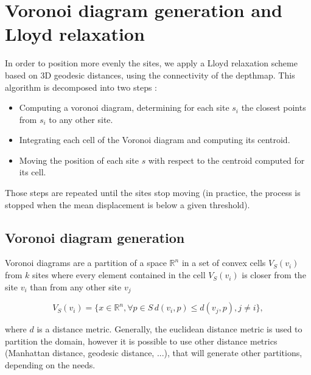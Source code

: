 \documentclass[11pt,fleqn]{book} %
\newcommand{\arnaud}[1]{\textcolor{red}{$<$ #1 $>$}}
\begin{document}

\section{Voronoi diagram generation and Lloyd relaxation}
\label{sec:lloyd_relaxation}

In order to position more evenly the sites, we apply a Lloyd relaxation scheme based on 3D geodesic distances, using the connectivity of the depthmap.
This algorithm is decomposed into two steps : 

\begin{itemize}
	\item Computing a voronoi diagram, determining for each site $s_i$ the closest points from $s_i$ to any other site.
	\item Integrating each cell of the Voronoi diagram and computing its centroid.
	\item Moving the position of each site $s$ with respect to the centroid computed for its cell.
\end{itemize}

Those steps are repeated until the sites stop moving (in practice, the process is stopped when the mean displacement is below a given threshold).

\subsection{Voronoi diagram generation}
Voronoi diagrams \cite{Vor08} are a partition of a space $\mathbb{R}^n$ in a set of convex cells $V_S(v_i)$ from $k$ sites where every element contained in the cell $V_S(v_i)$ is closer from the site $v_i$ than from any other site $v_j$

\begin{equation}
\label{eq:voronoi_cell}
	V_S(v_i) = \{ x \in \mathbb{R}^n, \forall p \in S\, d(v_i,p) \leq d(v_j,p), j \neq i\},
\end{equation}

where $d$ is a distance metric. Generally, the euclidean distance metric is used to partition the domain, however it is possible to use other distance metrics (Manhattan distance, geodesic distance, ...), that will generate other partitions, depending on the needs.
\end{document}
